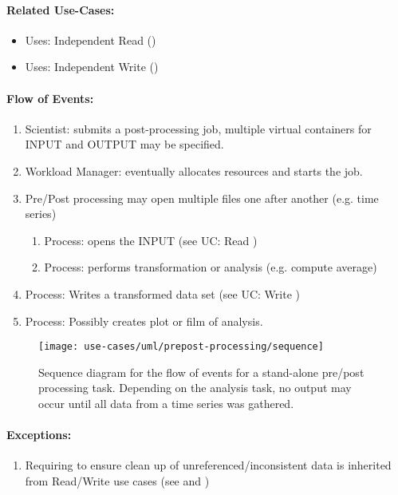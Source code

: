 \paragraph{Related Use-Cases:}
\begin{itemize}
	\item Uses: Independent Read ()
	\item Uses: Independent Write ()
\end{itemize}


\paragraph{Flow of Events:}
\begin{enumerate}
	\item Scientist: submits a post-processing job, multiple virtual containers for INPUT and OUTPUT may be specified.
	\item Workload Manager: eventually allocates resources and starts the job.
	\item Pre/Post processing may open multiple files one after another (e.g. time series)
	\begin{enumerate}
	\item Process: opens the INPUT  (see UC: Read )
	\item Process: performs transformation or analysis (e.g. compute average)
	\end{enumerate}
	\item Process: Writes a transformed data set (see UC: Write )
	\item Process: Possibly creates plot or film of analysis.
\end{enumerate}


\begin{figure}
	\centering
	\texttt{[image: use-cases/uml/prepost-processing/sequence]}
	\caption{Sequence diagram for the flow of events for a stand-alone pre/post processing task. Depending on the analysis task, no output may occur until all data from a time series was gathered.}
	\label{fig:sequence pre + post processing}
\end{figure}



\paragraph{Exceptions:}
\begin{enumerate}
	\item  Requiring to ensure clean up of unreferenced/inconsistent data is inherited from Read/Write use cases (see  and )
\end{enumerate}




